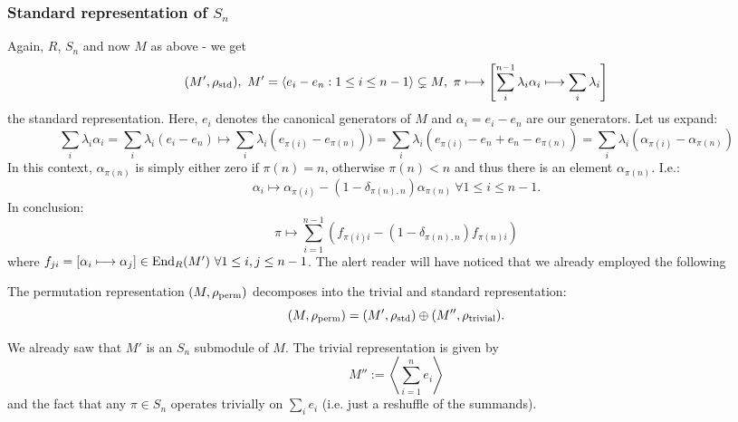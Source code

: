 \subsubsection{Standard representation of $S_n$}
Again, $R$, $S_n$ and now $M$ as above - we get 
$$(M',\rho_{\tmr{std}}),\ M' = \left<e_i - e_n : 1 \leq i \leq n - 1\right> \subsetneq M,\ \pi \longmapsto \left[\sum_i^{n-1} \lambda_i \alpha_i \longmapsto \sum_i \lambda_i \right]$$
the standard representation. Here, $e_i$ denotes the canonical generators of $M$ and $\alpha_i = e_i - e_n$ are our generators. Let us expand:
$$\sum_i \lambda_i \alpha_i = \sum_i \lambda_i (e_i - e_n)\longmapsto \sum_i \lambda_i (e_{\pi(i)} - e_{\pi(n)}) ) = \sum_i \lambda_i(e_{\pi(i)} - e_n + e_n - e_{\pi(n)}) = \sum_i \lambda_i (\alpha_{\pi(i)} - \alpha_{\pi(n)})$$
In this context, $\alpha_{\pi(n)}$ is simply either zero if $\pi(n) = n$, otherwise $\pi(n) < n$ and thus there is an element $\alpha_{\pi(n)}$. I.e.:
$$\alpha_i \longmapsto \alpha_{\pi(i)} - (1 - \delta_{\pi(n),n}) \alpha_{\pi(n)}\ \forall 1 \leq i \leq n - 1.$$ 
In conclusion:
$$\pi \longmapsto \sum_{i=1}^{n-1} \left(f_{\pi(i)i} - (1 - \delta_{\pi(n),n}) f_{\pi(n)i}\right)$$
where $f_{ji} = [\alpha_i \longmapsto \alpha_j] \in \mathrm{End}_R(M')\ \forall 1 \leq i,j \leq n - 1$.
The alert reader will have noticed that we already employed the following
\begin{prop} The permutation representation $(M,\rho_{\mathrm{perm}})$ decomposes into the trivial and standard representation:
$$(M,\rho_{\mathrm{perm}}) = (M',\rho_{\mathrm{std}}) \oplus  (M'',\rho_{\mathrm{trivial}}).$$
\end{prop}
We already saw that $M'$ is an $S_n$ submodule of $M$. The trivial representation is given by
$$M'' := \left<\sum_{i=1}^n e_i\right>$$
and the fact that any $\pi \in S_n$ operates trivially on $\sum_i e_i$ (i.e. just a reshuffle of the summands).